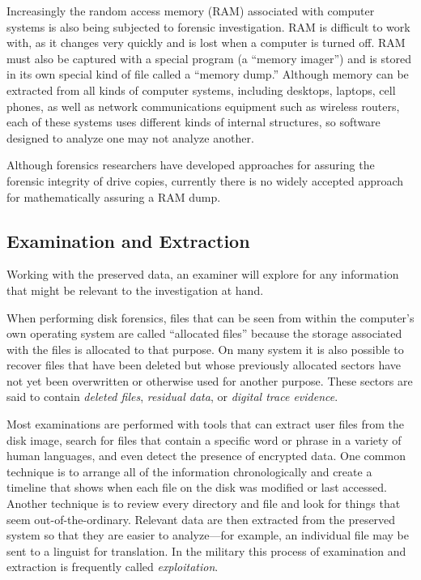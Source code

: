 
  Increasingly the random access memory (RAM) associated with computer
  systems is also being subjected to forensic investigation. RAM is
  difficult to work with, as it changes very quickly and is lost when
  a computer is turned off. RAM must also be captured with a special
  program (a ``memory imager'') and is stored in its own special kind
  of file called a ``memory dump.'' Although memory can be extracted from all
  kinds of computer systems, including desktops, laptops, cell phones,
  as well as network communications equipment such as wireless
  routers, each of these systems uses different kinds of internal
  structures, so software designed to analyze one may not analyze another.

  Although forensics researchers have developed approaches for
  assuring the forensic integrity of drive copies, currently there is
  no widely accepted approach for mathematically assuring a RAM dump.

\subsection{Examination and Extraction} Working with the preserved data, an
  examiner will explore for any information that might be
  relevant to the investigation at hand. 

  When performing disk forensics, files that can be seen from within
  the computer's own operating system are called ``allocated files''
  because the storage associated with the files is allocated to that
  purpose. On many system it is also possible to recover files that have
  been deleted but whose previously allocated sectors have not yet
  been overwritten or otherwise used for another purpose. These
  sectors are said to contain \emph{deleted files}, \emph{residual data}, or
  \emph{digital trace evidence}.

Most examinations are performed
  with tools that can extract user files from the disk image, search for files that contain a specific word or phrase
  in a variety of human languages, and even detect the presence of
  encrypted data. One common technique is to arrange all of the
  information chronologically and create a timeline that shows when
  each file on the disk was modified or last accessed. Another 
  technique is to review every directory and file and look for
  things that seem out-of-the-ordinary. Relevant data are then
  extracted from the preserved system so that they are easier to
  analyze---for example, an individual file may be sent to a linguist
  for translation. In the military this process of examination and extraction
  is frequently called \emph{exploitation}.

